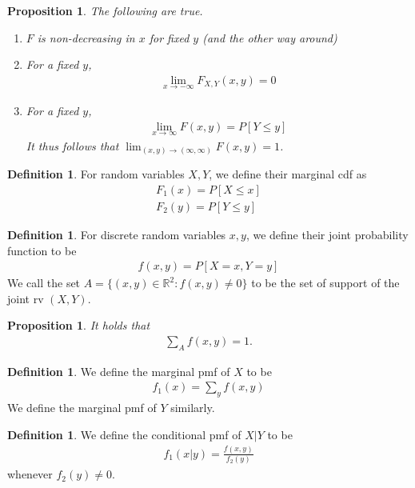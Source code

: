 \documentclass[11pt]{amsart}
\newtheorem{proposition}[theorem]{Proposition}
\theoremstyle{definition}
\newtheorem{definition}[theorem]{Definition}
\numberwithin{equation}{section}
\begin{document}
\begin{proposition}
    The following are true.
    \begin{enumerate}
        \item [(i)] $F$ is non-decreasing in $x$ for fixed $y$ (and the other way around)
        \item [(ii)] For a fixed $y$, 
        \begin{align*}
            \lim_{x\to-\infty}F_{X,Y}(x,y)=0
        \end{align*}
        \item [(iii)] For a fixed $y$,
        \begin{align*}
            \lim_{x\to\infty} F(x,y)=P[Y\le y]
        \end{align*}
        It thus follows that $\lim_{(x,y)\to(\infty,\infty)}F(x,y)=1$.
    \end{enumerate}
\end{proposition}
\begin{definition}
    For random variables $X,Y$, we define their marginal cdf as
    \begin{align*}
        F_1(x)=P[X\le x]\\
        F_2(y)=P[Y\le y]
    \end{align*}
\end{definition}
\begin{definition}
    For discrete random variables $x,y$, we define their joint probability function to be
    \begin{align*}
        f(x,y)=P[X=x,Y=y]
    \end{align*}
    We call the set $A=\{(x,y)\in\mathbb R^2:f(x,y)\ne0\}$ to be the set of support of the joint rv $(X,Y)$.
\end{definition}
\begin{proposition}
    It holds that
    \begin{align*}
        \sum_Af(x,y)=1.
    \end{align*}
\end{proposition}
\begin{definition}
    We define the marginal pmf of $X$ to be
    \begin{align*}
        f_1(x)=\sum_yf(x,y)
    \end{align*}
    We define the marginal pmf of $Y$ similarly.
\end{definition}
\begin{definition}
    We define the conditional pmf of $X|Y$ to be 
    \begin{align*}
        f_1(x|y)=\frac{f(x,y)}{f_2(y)}
    \end{align*}
    whenever $f_2(y)\ne0$.
\end{definition}
\end{document}
